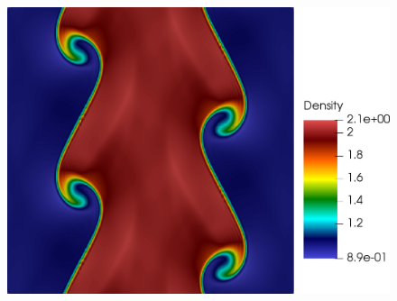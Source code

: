 \begin{figure}[h!]
\includegraphics[scale=0.115]{data/Compressible_Euler/KH/Snapshots/density_exact_614.png}\\


\end{figure}
